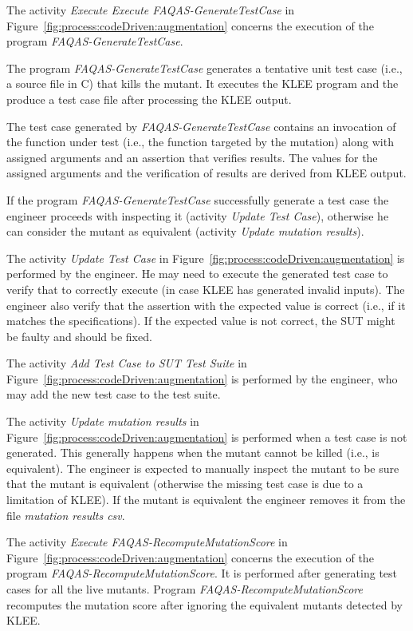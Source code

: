\RQ{} The activity \emph{Execute Execute FAQAS-GenerateTestCase} in Figure~\ref{fig:process:codeDriven:augmentation} concerns the execution of the program \emph{FAQAS-GenerateTestCase}.

\RQ{} The program \emph{FAQAS-GenerateTestCase} generates a tentative unit test case (i.e., a source file in C) that kills the mutant. It executes the KLEE program and the produce a test case file after processing the KLEE output.

\RQ{} The test case generated by \emph{FAQAS-GenerateTestCase} contains an invocation of the function under test (i.e., the function targeted  by the mutation) along with assigned arguments and an assertion that verifies results. The values for the assigned arguments and the verification of results are derived from KLEE output.

\RQ{} If the program \emph{FAQAS-GenerateTestCase} successfully generate a test case the engineer proceeds with inspecting it (activity \emph{Update Test  Case}), otherwise he can consider the mutant as equivalent (activity \emph{Update mutation results}).

\RQ{} The activity \emph{Update Test  Case} in Figure~\ref{fig:process:codeDriven:augmentation} is performed by the engineer. He may need to execute the generated test case to verify that to correctly execute (in case KLEE has generated invalid inputs). The engineer also verify that the assertion with the expected value is correct (i.e., if it matches the specifications). If the expected value is not correct, the SUT might be faulty and should be fixed.

\RQ{} The activity \emph{Add Test Case to SUT Test Suite} in Figure~\ref{fig:process:codeDriven:augmentation} is performed by the engineer, who may add the new test case to the test suite.

\RQ{} The activity \emph{Update mutation results} in Figure~\ref{fig:process:codeDriven:augmentation} is performed when a test case is not generated. This generally happens when the mutant cannot be killed (i.e., is equivalent). The engineer is expected to manually inspect the mutant to be sure that the mutant is equivalent (otherwise the missing test case is due to a limitation of KLEE). If the mutant is equivalent the engineer removes it from the file \emph{mutation results csv}.

\RQ{} The activity \emph{Execute FAQAS-RecomputeMutationScore} in Figure~\ref{fig:process:codeDriven:augmentation}  concerns the execution of the program \emph{FAQAS-RecomputeMutationScore}. It is performed after generating test cases for all the live mutants. Program \emph{FAQAS-RecomputeMutationScore} recomputes the mutation score after ignoring the equivalent mutants detected by KLEE.

